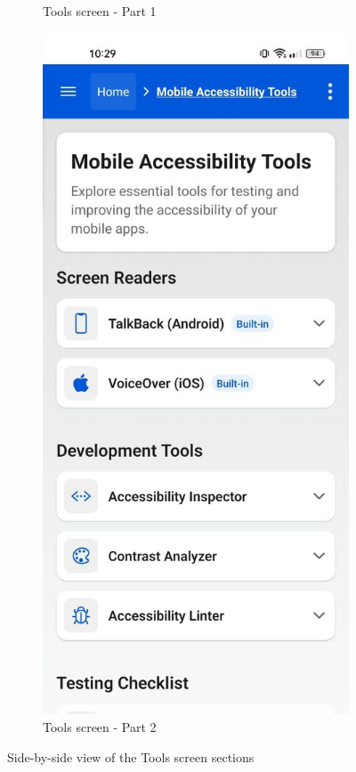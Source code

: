 \begin{figure}[ht]
\begin{subfigure}[b]{0.48\textwidth}
        \caption{Tools screen - Part 1}
        \label{fig:tools-left}
    \end{subfigure}
    \hfill
    \begin{subfigure}[b]{0.48\textwidth}
        \centering
        \includegraphics[width=\linewidth]{img/tools2.jpg}
        \caption{Tools screen - Part 2}
        \label{fig:tools-right}
    \end{subfigure}
    \caption{Side-by-side view of the Tools screen sections}
    \label{fig:tools_screens_sidebyside}
\end{figure}
\FloatBarrier

